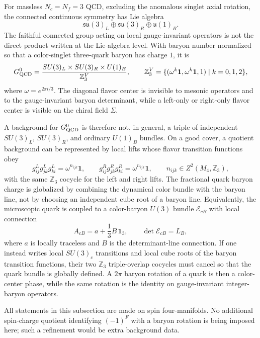 \begin{definition}
\label{def:qcd-cfl-faithful-global-backgrounds}
For massless \(N_c=N_f=3\) QCD, excluding the anomalous singlet axial
rotation, the connected continuous symmetry has Lie algebra
\[
  \mathfrak{su}(3)_L\oplus\mathfrak{su}(3)_R\oplus\mathfrak u(1)_B .
\]
The faithful connected group acting on local gauge-invariant operators is not
the direct product written at the Lie-algebra level.  With baryon number
normalized so that a color-singlet three-quark baryon has charge \(1\), it is
\begin{equation}
  G_{\rm QCD}^{0}
  =
  \frac{SU(3)_L\times SU(3)_R\times U(1)_B}
       {\mathbb Z_3^{V}},
  \qquad
  \mathbb Z_3^{V}
  =
  \{(\omega^k\mathbf 1,\omega^k\mathbf 1,1)\mid k=0,1,2\},
  \label{eq:qcd-cfl-faithful-connected-symmetry}
\end{equation}
where \(\omega=e^{2\pi i/3}\).  The diagonal flavor center is invisible to
mesonic operators and to the gauge-invariant baryon determinant, while a
left-only or right-only flavor center is visible on the chiral field
\(\Sigma\).

A background for \(G_{\rm QCD}^{0}\) is therefore not, in general, a triple of
independent \(SU(3)_L\), \(SU(3)_R\), and ordinary \(U(1)_B\) bundles.  On a
good cover, a quotient background can be represented by local lifts whose
flavor transition functions obey
\[
  g^L_{ij}g^L_{jk}g^L_{ki}
  =
  \omega^{n_{ijk}}\mathbf 1,
  \qquad
  g^R_{ij}g^R_{jk}g^R_{ki}
  =
  \omega^{n_{ijk}}\mathbf 1,
  \qquad
  n_{ijk}\in Z^2(M_4,\mathbb Z_3),
\]
with the same \(\mathbb Z_3\) cocycle for the left and right lifts.  The
fractional quark baryon charge is globalized by combining the dynamical color
bundle with the baryon line, not by choosing an independent cube root of a
baryon line.  Equivalently, the microscopic quark is coupled to a
color-baryon \(U(3)\) bundle \(\mathcal E_{cB}\) with local connection
\begin{equation}
  A_{cB}=a+\frac13B\,\mathbf 1_3,
  \qquad
  \det\mathcal E_{cB}=L_B ,
  \label{eq:qcd-cfl-color-baryon-u3-lift}
\end{equation}
where \(a\) is locally traceless and \(B\) is the determinant-line connection.
If one instead writes local \(SU(3)_c\) transitions and local cube roots of
the baryon transition functions, their two \(\mathbb Z_3\) triple-overlap
cocycles must cancel so that the quark bundle is globally defined.  A
\(2\pi\) baryon rotation of a quark is then a color-center phase, while the
same rotation is the identity on gauge-invariant integer-baryon operators.

All statements in this subsection are made on spin four-manifolds.  No
additional spin-charge quotient identifying \((-1)^F\) with a baryon rotation
is being imposed here; such a refinement would be extra background data.
\end{definition}

